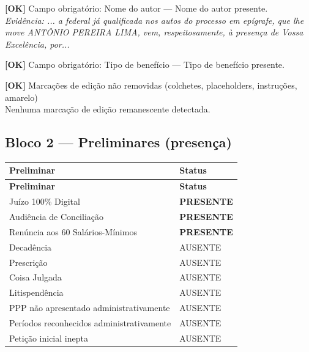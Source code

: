 \documentclass[12pt,a4paper]{article}
\newcommand{\statusOK}[1]{\textcolor{corOK}{\textbf{[OK]}} #1}
\begin{document}
\medskip
\statusOK{Campo obrigatório: Nome do autor} --- Nome do autor presente.\\
\textit{Evidência: ... a federal já qualificada nos autos do processo em epígrafe, que lhe move ANTÔNIO PEREIRA LIMA, vem, respeitosamente, à presença de Vossa Excelência, por...}

\medskip
\statusOK{Campo obrigatório: Tipo de benefício} --- Tipo de benefício presente.

\medskip
\statusOK{Marcações de edição não removidas (colchetes, placeholders, instruções, amarelo)}\\
Nenhuma marcação de edição remanescente detectada.

\subsection{Bloco 2 --- Preliminares (presença)}

\begin{longtable}{p{8.5cm} p{4.5cm}}
  \toprule
  \textbf{Preliminar} & \textbf{Status} \\
  \midrule
  \endfirsthead
  \toprule
  \textbf{Preliminar} & \textbf{Status} \\
  \midrule
  \endhead
  Juízo 100\% Digital                           & \textcolor{corOK}{\textbf{PRESENTE}} \\
  Audiência de Conciliação                      & \textcolor{corOK}{\textbf{PRESENTE}} \\
  Renúncia aos 60 Salários-Mínimos              & \textcolor{corOK}{\textbf{PRESENTE}} \\
  Decadência                                    & AUSENTE \\
  Prescrição                                    & AUSENTE \\
  Coisa Julgada                                 & AUSENTE \\
  Litispendência                                & AUSENTE \\
  PPP não apresentado administrativamente       & AUSENTE \\
  Períodos reconhecidos administrativamente     & AUSENTE \\
  Petição inicial inepta                        & AUSENTE \\
  \bottomrule
\end{longtable}
\end{document}
